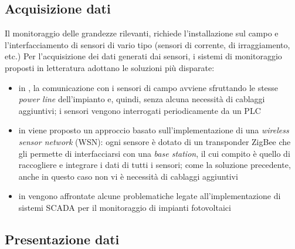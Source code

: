 \subsection{Acquisizione dati}
Il monitoraggio delle grandezze rilevanti, richiede l'installazione sul campo e 
l'interfacciamento di sensori di vario tipo (sensori di corrente, di irraggiamento, etc.)
Per l'acquisizione dei dati generati dai sensori, i sistemi di monitoraggio proposti in 
letteratura adottano le soluzioni pi\`u disparate:
%
\begin{itemize}
\item in \cite{roman06}, la comunicazione con i sensori di campo avviene sfruttando  
      le stesse \emph{power line} dell'impianto e, quindi, senza alcuna necessit\`a di 
      cablaggi aggiuntivi; i sensori vengono interrogati periodicamente da un PLC
\item in \cite{xiaoli11} viene proposto un approccio basato sull'implementazione di una 
      \emph{wireless sensor network} (WSN): ogni sensore \`e dotato di un transponder 
      ZigBee\cite{zigbee} che gli permette di interfacciarsi con una \emph{base station},
      il cui compito \`e quello di raccogliere e integrare i dati di tutti i sensori;
      come la soluzione precedente, anche in questo caso non vi \`e necessit\`a di 
      cablaggi aggiuntivi
\item in \cite{guozhen09} vengono affrontate alcune problematiche legate 
      all'implementazione di sistemi SCADA per il monitoraggio di impianti fotovoltaici
\end{itemize}
%


\subsection{Presentazione dati}








